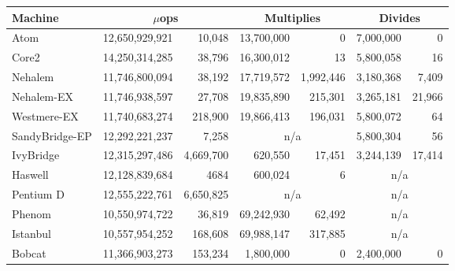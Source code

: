 \begin{tabular}{|l||r@{$\pm$}r||r@{$\pm$}r||r@{$\pm$}r|}

\hline
Machine   & \multicolumn{2}{c||}{$\mu$ops} & \multicolumn{2}{c||}{Multiplies} & \multicolumn{2}{c|}{Divides} \\

\hline
\hline

Atom           & 12,650,929,921 & 10,048 &  13,700,000 &  0     &   7,000,000 & 0      \\
\hline
Core2          & 14,250,314,285 & 38,796 &  16,300,012 & 13     &   5,800,058 & 16 \\
\hline
Nehalem        & 11,746,800,094 & 38,192 & 17,719,572 & 1,992,446 & 3,180,368 & 7,409    \\
\hline
Nehalem-EX     & 11,746,938,597 & 27,708 & 19,835,890 & 215,301   &  3,265,181 & 21,966    \\
\hline
Westmere-EX       & 11,740,683,274 & 218,900 & 19,866,413 & 196,031 & 5,800,072           &  64 \\
\hline
SandyBridge-EP  & 12,292,221,237 &  7,258 & \multicolumn{2}{c||}{n/a}   &  5,800,304 & 56    \\
\hline
IvyBridge      & 12,315,297,486 & 4,669,700 & 620,550    & 17,451           &  3,244,139          & 17,414 \\
\hline
Haswell		& 12,128,839,684 & 4684 & 600,024 & 6 & \multicolumn{2}{c||}{n/a} \\
\hline
Pentium D      & 12,555,222,761 & 6,650,825 & \multicolumn{2}{c||}{n/a} & \multicolumn{2}{c|}{n/a} \\
\hline
Phenom         & 10,550,974,722 & 36,819 &  69,242,930 & 62,492  & \multicolumn{2}{c|}{n/a} \\
\hline
Istanbul       & 10,557,954,252 & 168,608 &  69,988,147 & 317,885    & \multicolumn{2}{c|}{n/a} \\
\hline
Bobcat         & 11,366,903,273 & 153,234   &   1,800,000 & 0    & 2,400,000 & 0 \\
\hline
\end{tabular}
%

